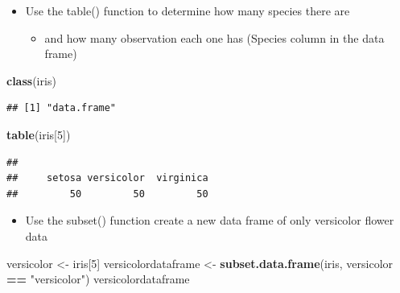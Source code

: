 \documentclass[]{article}
\newenvironment{Shaded}{\begin{snugshade}}{\end{snugshade}}
\newcommand{\DecValTok}[1]{\textcolor[rgb]{0.00,0.00,0.81}{#1}}
\newcommand{\KeywordTok}[1]{\textcolor[rgb]{0.13,0.29,0.53}{\textbf{#1}}}
\newcommand{\NormalTok}[1]{#1}
\newcommand{\OperatorTok}[1]{\textcolor[rgb]{0.81,0.36,0.00}{\textbf{#1}}}
\newcommand{\StringTok}[1]{\textcolor[rgb]{0.31,0.60,0.02}{#1}}
\providecommand{\tightlist}{%
  \setlength{\itemsep}{0pt}\setlength{\parskip}{0pt}}
\begin{document}
\begin{itemize}
\tightlist
\item
  Use the table() function to determine how many species there are

  \begin{itemize}
  \tightlist
  \item
    and how many observation each one has (Species column in the data
    frame)
  \end{itemize}
\end{itemize}

\begin{Shaded}
\begin{Highlighting}[]
\KeywordTok{class}\NormalTok{(iris)}
\end{Highlighting}
\end{Shaded}

\begin{verbatim}
## [1] "data.frame"
\end{verbatim}

\begin{Shaded}
\begin{Highlighting}[]
\KeywordTok{table}\NormalTok{(iris[}\DecValTok{5}\NormalTok{])}
\end{Highlighting}
\end{Shaded}

\begin{verbatim}
## 
##     setosa versicolor  virginica 
##         50         50         50
\end{verbatim}

\begin{itemize}
\tightlist
\item
  Use the subset() function create a new data frame of only versicolor
  flower data
\end{itemize}

\begin{Shaded}
\begin{Highlighting}[]
\NormalTok{versicolor <-}\StringTok{ }\NormalTok{iris[}\DecValTok{5}\NormalTok{]}
\NormalTok{versicolordataframe <-}\StringTok{ }\KeywordTok{subset.data.frame}\NormalTok{(iris, versicolor }\OperatorTok{==}\StringTok{ "versicolor"}\NormalTok{)}
\NormalTok{versicolordataframe}
\end{Highlighting}
\end{Shaded}
\end{document}
